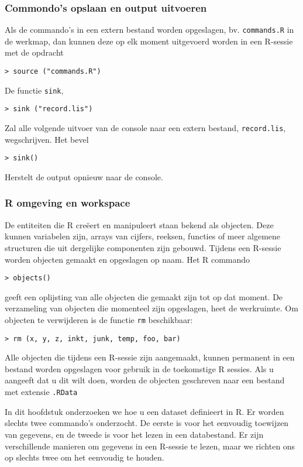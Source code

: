 \subsubsection{Commondo's opslaan en output uitvoeren}
Als de commando's in een extern bestand worden opgeslagen, bv. \texttt{commands.R} in de werkmap, dan kunnen deze op elk moment uitgevoerd worden in een R-sessie met de opdracht
\begin{lstlisting}
> source ("commands.R")
\end{lstlisting}
De functie \texttt{sink},
\begin{lstlisting}
> sink ("record.lis")
\end{lstlisting}
Zal alle volgende uitvoer van de console naar een extern bestand, \texttt{record.lis}, wegschrijven. Het bevel
\begin{lstlisting}
> sink()
\end{lstlisting}
Herstelt de output  opnieuw naar de console.

\subsubsection{R omgeving en workspace}
De entiteiten die R creëert en manipuleert staan bekend als objecten. Deze kunnen variabelen zijn, arrays
van cijfers, reeksen, functies of meer algemene structuren die uit dergelijke componenten zijn gebouwd.
Tijdens een R-sessie worden objecten gemaakt en opgeslagen op naam.
Het R commando
\begin{lstlisting}
> objects()
\end{lstlisting}
geeft een oplijsting van alle objecten die gemaakt zijn tot op dat moment.
De verzameling van objecten die momenteel zijn opgeslagen, heet de werkruimte.
Om objecten te verwijderen is de functie \texttt{rm} beschikbaar:
\begin{lstlisting}
> rm (x, y, z, inkt, junk, temp, foo, bar)
\end{lstlisting}
Alle objecten die tijdens een R-sessie zijn aangemaakt, kunnen permanent in een bestand worden opgeslagen voor gebruik in de toekomstige
R sessies. Als u aangeeft dat u dit wilt doen, worden de objecten geschreven naar een bestand met extensie \texttt{.RData}


In dit hoofdstuk onderzoeken we hoe u een dataset definieert in R. Er worden slechts twee commando's onderzocht. De eerste is voor het eenvoudig toewijzen van gegevens, en de tweede is voor het lezen in een databestand. Er zijn verschillende manieren om gegevens in een R-sessie te lezen, maar we richten ons op slechts twee om het eenvoudig te houden.
